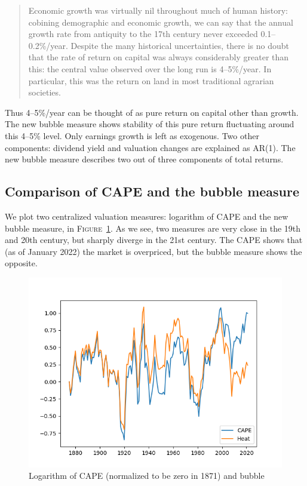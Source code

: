 \documentclass[12pt]{amsart}
\theoremstyle{definition}
\begin{document}
\begin{quote}
Economic growth was virtually nil throughout much of human history: cobining demographic and economic growth, we can say that the annual growth rate from antiquity to the 17th century never exceeded 0.1--0.2\%/year. Despite the many historical uncertainties, there is no doubt that the rate of return on capital was always considerably greater than this: the central value observed over the long run is 4--5\%/year. In particular, this was the return on land in most traditional agrarian societies. 
\end{quote}

Thus 4--5\%/year can be thought of as pure return on capital other than growth. The new bubble measure shows stability of this pure return fluctuating around this 4--5\% level. Only earnings growth is left as exogenous. Two other components: dividend yield and valuation changes are explained as AR(1). The new bubble measure describes two out of three components of total returns.

\subsection{Comparison of CAPE and the bubble measure} We plot two centralized valuation measures: logarithm of CAPE and the new bubble measure, in \textsc{Figure~\ref{fig:compare}}. As we see, two measures are very close in the 19th and 20th century, but sharply diverge in the 21st century. The CAPE shows that (as of January 2022) the market is overpriced, but the bubble measure shows the opposite. 


\begin{figure}[t]
\includegraphics[width = 12cm]{compare.png}
\caption{Logarithm of CAPE (normalized to be zero in 1871) and bubble}
\label{fig:compare}
\end{figure}
\end{document}
